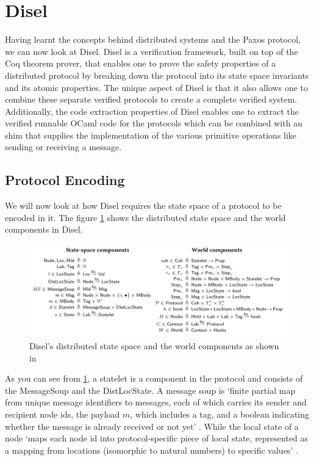 \section{Disel}
Having learnt the concepts behind distributed systems and the Paxos protocol, we
can now look at Disel.
Disel \cite{9} is a verification framework, built on top of the Coq theorem prover,
that enables one to prove the safety properties of a distributed protocol by
breaking down the protocol into its state space invariants and its atomic properties.
The unique aspect of Disel is that it also allows one to combine these separate
verified protocols to create a complete verified system. Additionally, the
code extraction properties of Disel enables one to extract the verified runnable
OCaml code for the protocols which can be combined with an shim that supplies
the implementation of the various primitive operations like sending or receiving
a message.

\subsection{Protocol Encoding}
We will now look at how Disel requires the state space of a protocol to be encoded in it.
The figure \ref{fig:DiselStateSpace} shows the distributed state space and the world
components in Disel.

\begin{figure}
\centering
\includegraphics[width=\textwidth]{figures/disel_state_space.jpeg}
\caption{Disel's distributed state space and the world components as shown in \cite{9}
\label{fig:DiselStateSpace}}
\end{figure}

As you can see from \ref{fig:DiselStateSpace}, a \textsf{statelet} is a component
in the protocol and consists of the \textsf{MessageSoup}
and the \textsf{DistLocState}. A message soup is `finite partial map from unique message
identifiers to messages,
each of which carries its sender and recipient node ids, the payload $m$, which
includes a tag, and a boolean indicating whether the message is already received
or not yet' \cite{9}. While the local state of a node
`maps each node id into protocol-specific piece of local state, represented as a
mapping from locations (isomorphic to natural numbers) to specific values' \cite{9}.

